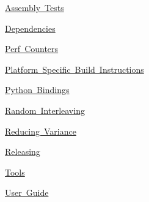 
\begin{DoxyItemize}
\item \mbox{\hyperlink{md_build__deps_googlebenchmark_src_docs_AssemblyTests}{Assembly Tests}}
\item \mbox{\hyperlink{md_build__deps_googlebenchmark_src_docs_dependencies}{Dependencies}}
\item \mbox{\hyperlink{md_build__deps_googlebenchmark_src_docs_perf_counters}{Perf Counters}}
\item \mbox{\hyperlink{md_build__deps_googlebenchmark_src_docs_platform_specific_build_instructions}{Platform Specific Build Instructions}}
\item \mbox{\hyperlink{md_build__deps_googlebenchmark_src_docs_python_bindings}{Python Bindings}}
\item \mbox{\hyperlink{md_build__deps_googlebenchmark_src_docs_random_interleaving}{Random Interleaving}}
\item \mbox{\hyperlink{md_build__deps_googlebenchmark_src_docs_reducing_variance}{Reducing Variance}}
\item \mbox{\hyperlink{md_build__deps_googlebenchmark_src_docs_releasing}{Releasing}}
\item \mbox{\hyperlink{md_build__deps_googlebenchmark_src_docs_tools}{Tools}}
\item \mbox{\hyperlink{md_build__deps_googlebenchmark_src_docs_user_guide}{User Guide}} 
\end{DoxyItemize}